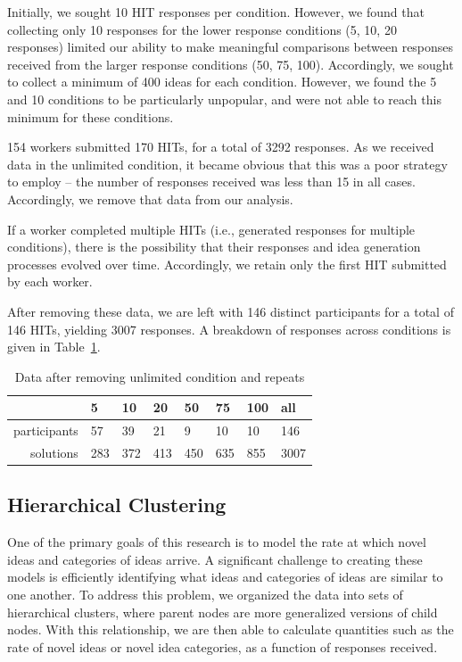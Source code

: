 Initially, we sought 10 HIT responses per condition. However, we found that collecting only 10 responses for the lower response conditions (5, 10, 20 responses) limited our ability to make meaningful comparisons between responses received from the larger response conditions (50, 75, 100). Accordingly, we sought to collect a minimum of 400 ideas for each condition. However, we found the 5 and 10 conditions to be particularly unpopular, and were not able to reach this minimum for these conditions.

154 workers submitted 170 HITs, for a total of 3292 responses. As we received data in the unlimited condition, it became obvious that this was a poor strategy to employ -- the number of responses received was less than 15 in all cases. Accordingly, we remove that data from our analysis.

If a worker completed multiple HITs (i.e., generated responses for multiple conditions), there is the possibility that their responses and idea generation processes evolved over time. Accordingly, we retain only the first HIT submitted by each worker.

After removing these data, we are left with 146 distinct participants for a total of 146 HITs, yielding 3007 responses. A breakdown of responses across conditions is given in Table~\ref{tab:data_collected}.

\begin{table}[h!]
\begin{tabular}{r | l l l l l l l }
    & 5 & 10 & 20 & 50 & 75 & 100 & all \\ \hline
    participants & 57 & 39 & 21 & 9 & 10 & 10 & 146 \\
    solutions & 283 & 372 & 413 & 450 & 635 & 855 & 3007
\end{tabular}
\caption{Data after removing unlimited condition and repeats}
\label{tab:data_collected}
\end{table}


\subsection{Hierarchical Clustering}
One of the primary goals of this research is to model the rate at which novel ideas and categories of ideas arrive. A significant challenge to creating these models is efficiently identifying what ideas and categories of ideas are similar to one another. To address this problem, we organized the data into sets of hierarchical clusters, where parent nodes are more generalized versions of child nodes. With this relationship, we are then able to calculate quantities such as the rate of novel ideas or novel idea categories, as a function of responses received. 


